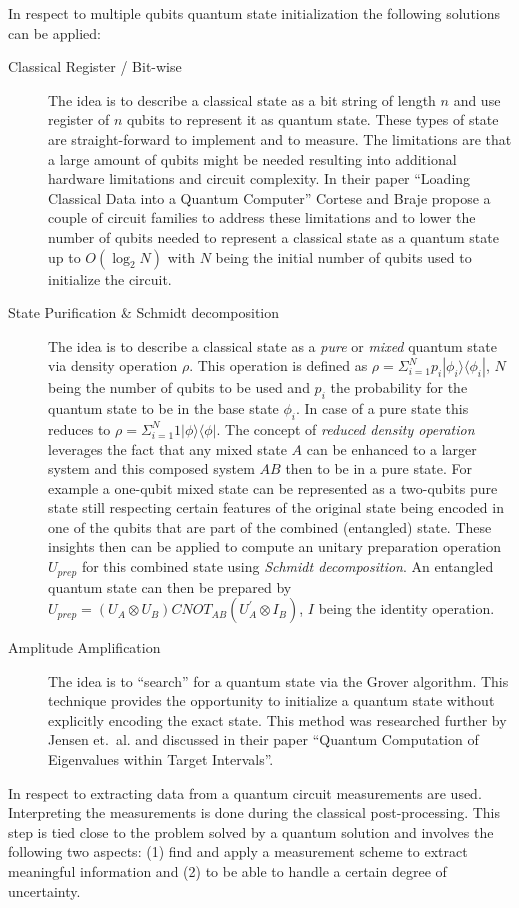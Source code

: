 In respect to multiple qubits quantum state initialization the following solutions can be applied:
\begin{description}
  \item [Classical Register / Bit-wise] The idea is to describe a classical state as a bit string of length $n$ and use register of $n$ qubits to represent it as quantum state. These types of state are straight-forward to implement and to measure. The limitations are that a large amount of qubits might be needed resulting into additional hardware limitations and circuit complexity. In their paper \enquote{Loading Classical Data into a Quantum Computer} \cite{Corte_2018} Cortese and Braje propose a couple of circuit families to address these limitations and to lower the number of qubits needed to represent a classical state as a quantum state up to $O(\log_2{N})$ with $N$ being the initial number of qubits used to initialize the circuit.
  \item [State Purification \& Schmidt decomposition] The idea is to describe a classical state as a \emph{pure} or \emph{mixed} quantum state via density operation $\rho$. This operation is defined as $\rho = \Sigma_{i=1}^N p_i| \phi_i \rangle \langle \phi_i |$, $N$ being the number of qubits to be used and $p_i$ the probability for the quantum state to be in the base state $\phi_i$. In case of a pure state this reduces to $\rho = \Sigma_{i=1}^N 1| \phi \rangle \langle \phi |$. The concept of \emph{reduced density operation} leverages the fact that any mixed state $A$ can be enhanced to a larger system and this composed system $AB$ then to be in a pure state. \cite{Niels_2010}\cite{Lokho_2020}\cite{Qtb_Densit} For example a one-qubit mixed state can be represented as a two-qubits pure state still respecting certain features of the original state being encoded in one of the qubits that are part of the combined (entangled) state. These insights then can be applied to compute an unitary preparation operation $U_{prep}$ for this combined state using \emph{Schmidt decomposition}.\cite{Niels_2010} An entangled quantum state can then be prepared by $U_{prep} = (U_A \otimes U_B) CNOT_{AB} (U_A^{'} \otimes I_B)$, $I$ being the identity operation. \cite{Lokho_2020}
  \item [Amplitude Amplification] The idea is to \enquote{search} for a quantum state via the Grover algorithm. This technique provides the opportunity to initialize a quantum state without explicitly encoding the exact state.\cite{Daski_2015}\cite{Qtb_Grover} This method was researched further by Jensen et.~al. and discussed in their paper \enquote{Quantum Computation of Eigenvalues within Target Intervals}. \cite{Jense_2020}
\end{description}

In respect to extracting data from a quantum circuit measurements are used. Interpreting the measurements is done during the classical post-processing. This step is tied close to the problem solved by a quantum solution and involves the following two aspects: (1) find and apply a measurement scheme to extract meaningful information and (2) to be able to handle a certain degree of uncertainty. \cite{Daski_2015}\cite{Qtb_Measu}
